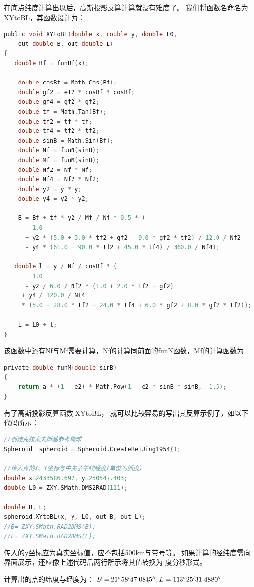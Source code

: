  在底点纬度计算出以后，高斯投影反算计算就没有难度了。
 我们将函数名命名为 XYtoBL，其函数设计为：
 \begin{lstlisting}[language=C]
public void XYtoBL(double x, double y, double L0,
    out double B, out double L)
{
   double Bf = funBf(x);

    double cosBf = Math.Cos(Bf);
    double gf2 = eT2 * cosBf * cosBf;
    double gf4 = gf2 * gf2;
    double tf = Math.Tan(Bf);
    double tf2 = tf * tf;
    double tf4 = tf2 * tf2;
    double sinB = Math.Sin(Bf);
    double Nf = funN(sinB);
    double Mf = funM(sinB);
    double Nf2 = Nf * Nf;
    double Nf4 = Nf2 * Nf2;
    double y2 = y * y;
    double y4 = y2 * y2;

    B = Bf + tf * y2 / Mf / Nf * 0.5 * (
       -1.0
      + y2 * (5.0 + 3.0 * tf2 + gf2 - 9.0 * gf2 * tf2) / 12.0 / Nf2
      - y4 * (61.0 + 90.0 * tf2 + 45.0 * tf4) / 360.0 / Nf4);

   double l = y / Nf / cosBf * (
        1.0
      - y2 / 6.0 / Nf2 * (1.0 + 2.0 * tf2 + gf2)
     + y4 / 120.0 / Nf4
     * (5.0 + 28.0 * tf2 + 24.0 * tf4 + 6.0 * gf2 + 8.0 * gf2 * tf2));

    L = L0 + l;
}
\end{lstlisting}

该函数中还有Nf与Mf需要计算，Nf的计算同前面的funN函数，Mf的计算函数为
 \begin{lstlisting}[language=C]
private double funM(double sinB)
{
    return a * (1 - e2) * Math.Pow(1 - e2 * sinB * sinB, -1.5);
}
\end{lstlisting}

 有了高斯投影反算函数 XYtoBL， 就可以比较容易的写出其反算示例了，如以下代码所示：

\begin{lstlisting}[language=C]
//创建克拉索夫斯基参考椭球
Spheroid  spheroid = Spheroid.CreateBeiJing1954();

//传入点的X、Y坐标与中央子午线经度(单位为弧度)
double x=2433586.692, y=250547.403;
double L0 = ZXY.SMath.DMS2RAD(111);

double B, L;
spheroid.XYtoBL(x, y, L0, out B, out L);
//B= ZXY.SMath.RAD2DMS(B);
//L= ZXY.SMath.RAD2DMS(L);
\end{lstlisting}

传入的y坐标应为真实坐标值，应不包括500km与带号等。
如果计算的经纬度需向界面展示，还应像上述代码后两行所示将其值转换为
度分秒形式。

计算出的点的纬度与经度为：
$B=21 ^\circ 58'47.0845'', L=113^\circ 25'31.4880''$

